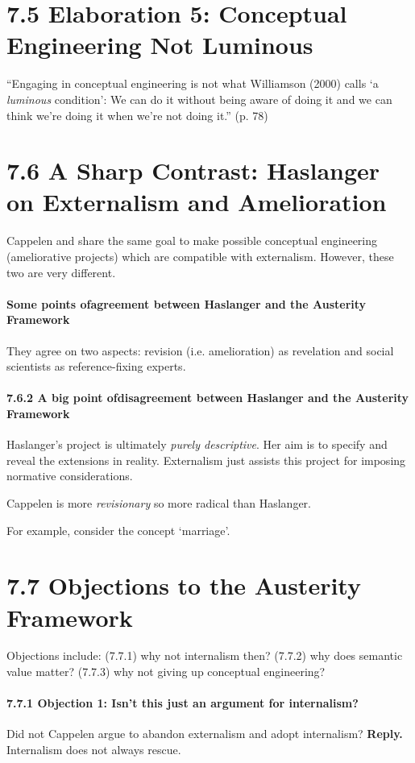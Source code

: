 \documentclass[
10pt, %
a4paper, %
twocolumn, %
landscape %
]{article}
\begin{document}
\section*{7.5 Elaboration 5: Conceptual Engineering Not Luminous}
``Engaging in conceptual engineering is not what Williamson (2000) calls `a \emph{luminous} condition': We can do it without being aware of doing it and we can think we’re doing it when we're not doing it.''
(p. 78)



\section*{7.6 A Sharp Contrast: Haslanger on Externalism and Amelioration}
Cappelen and \cite{Haslanger2012} share the same goal to make possible conceptual engineering (ameliorative projects) which are compatible with externalism. However, these two are very different.

\paragraph{Some points ofagreement between Haslanger and the Austerity Framework}
They agree on two aspects: revision (i.e. amelioration) as revelation and social scientists as reference-fixing experts.

\paragraph{7.6.2 A big point ofdisagreement between Haslanger and the Austerity Framework}
Haslanger's project is ultimately \emph{purely descriptive}. Her aim is to specify and reveal the extensions in reality. Externalism just assists this project for imposing normative considerations.

Cappelen is more \emph{revisionary} so more radical than Haslanger.

For example, consider the concept `marriage'.

\section*{7.7 Objections to the Austerity Framework}
 Objections include: (7.7.1) why not internalism then? (7.7.2) why does semantic value matter? (7.7.3) why not giving up conceptual engineering?

\paragraph{7.7.1 Objection 1: Isn't this just an argument for internalism?}
Did not Cappelen argue to abandon externalism and adopt internalism?
\noindent \textbf{Reply.}
Internalism does not always rescue.
\end{document}

